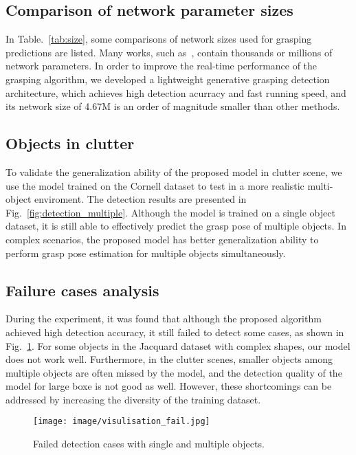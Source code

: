 \documentclass[journal]{IEEEtran}
\begin{document}
\subsection{Comparison of network parameter sizes}
In Table.~\ref{tab:size}, some comparisons of network sizes used for grasping predictions are listed. Many works, such as~\cite{pinto,levine,johns,chu}, contain thousands or millions of network parameters. In order to improve the real-time performance of the grasping algorithm, we developed a lightweight generative grasping detection architecture, which achieves high detection acurracy and fast running speed, and its network size of 4.67M is an order of magnitude smaller than other methods.

\subsection{Objects in clutter}
To validate the generalization ability of the proposed model in clutter scene, we use the model trained on the Cornell dataset to test in a more realistic multi-object enviroment. The detection results are presented in Fig.~\ref{fig:detection_multiple}. Although the model is trained on a single object dataset, it is still able to effectively predict the grasp pose of multiple objects. In complex scenarios, the proposed model has better generalization ability to perform grasp pose estimation for multiple objects simultaneously.


\subsection{Failure cases analysis}
During the experiment, it was found that although the proposed algorithm achieved high detection accuracy, it still failed to detect some cases, as shown in Fig.~\ref{fig:failure}. For some objects in the Jacquard dataset with complex shapes, our model does not work well. Furthermore, in the clutter scenes, smaller objects among multiple objects are often missed by the model, and the detection quality of the model for large boxe is not good as well. However, these shortcomings can be addressed by increasing the diversity of the training dataset.



\begin{figure}[t!]
	\centering  
	\texttt{[image: image/visulisation\_fail.jpg]}
	\caption{Failed detection cases with single and multiple objects.}
	\label{fig:failure}
\end{figure}
\end{document}
